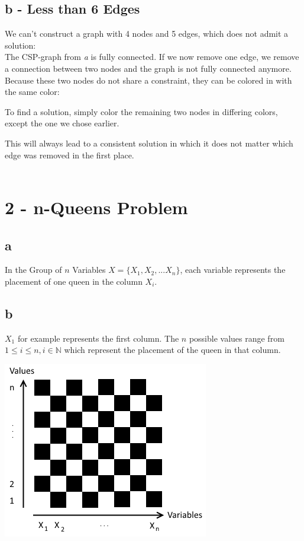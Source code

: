 \documentclass[a4paper]{article}
\begin{document}
\subsection*{b - Less than 6 Edges}
We can't construct a graph with 4 nodes and 5 edges, which does not admit a solution: \\
The CSP-graph from \textit{a} is fully connected. If we now remove one edge, we remove a connection between two nodes and the graph is not fully connected anymore. Because these two nodes do not share a constraint, they can be colored in with the same color:

To find a solution, simply color the remaining two nodes in differing colors, except the one we chose earlier.

This will always lead to a consistent solution in which it does not matter which edge was removed in the first place. \\ \\

\section*{2 - n-Queens Problem}
\subsection*{a}
In the Group of $n$ Variables $X = \{X_1, X_2, ... X_n\}$, each variable represents the placement of one queen in the column $X_i$.

\subsection*{b}
$X_1$ for example represents the first column. The $n$ possible values range from $1 \leq i \leq n, i \in \mathbb{N}$ which represent the placement of the queen in that column.

\begin{center}
	\includegraphics*[]{schach.png}
\end{center}
\end{document}
